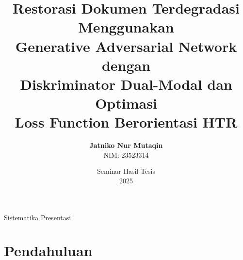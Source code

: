\documentclass[aspectratio=169,10pt,t]{beamer}
\title[Restorasi Dokumen GAN-HTR]{%
    \textbf{Restorasi Dokumen Terdegradasi Menggunakan}\\
    \textbf{Generative Adversarial Network dengan}\\
    \textbf{Diskriminator Dual-Modal dan Optimasi}\\
    \textbf{Loss Function Berorientasi HTR}}
\author[Jatniko N. M.]{%
    \textbf{Jatniko Nur Mutaqin}\\
    \small NIM: 23523314}
\institute[ITB]{%
    Program Studi Magister Informatika\\
    Institut Teknologi Bandung}
\date{Seminar Hasil Tesis\\2025}
\begin{document}
\begin{frame}[plain]
    \titlepage
\end{frame}

\begin{frame}{Sistematika Presentasi}
    \tableofcontents
\end{frame}

\section{Pendahuluan}
\end{document}
